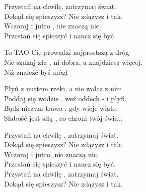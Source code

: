 \begin{text}
    Przystań na chwilę, zatrzymaj świat.\\
    Dokąd się spieszysz? Nie zdążysz i tak.\\
    Wczoraj i jutro , nie znaczą nic.\\
    Przestań się spieszyć i naucz się być

    \vin To TAO Cię prowadzi najprostszą z dróg.\\
    \vin Nie szukaj zła , ni dobra, a znajdziesz więcej,\\
    \vin Niż znaleźć byś mógł

    Płyń z nurtem rzeki, a nie walcz z nim.\\
    Poddaj się wodzie , weź oddech - i płyń.\\
    Bądź niczym trawa , gdy wieje wiatr.\\
    Słabość jest siłą , co chroni twój świat.

    Przystań na chwilę , zatrzymaj świat.\\
    Dokąd się spieszysz? Nie zdążysz i tak.\\
    Wczoraj i jutro, nie znaczą nic.\\
    Przestań się spieszyć i naucz się być.\\
    Przystań na chwilę , zatrzymaj świat.\\
    Dokąd się spieszysz? Nie zdążysz i tak.
\end{text}
\begin{chord}

\end{chord}